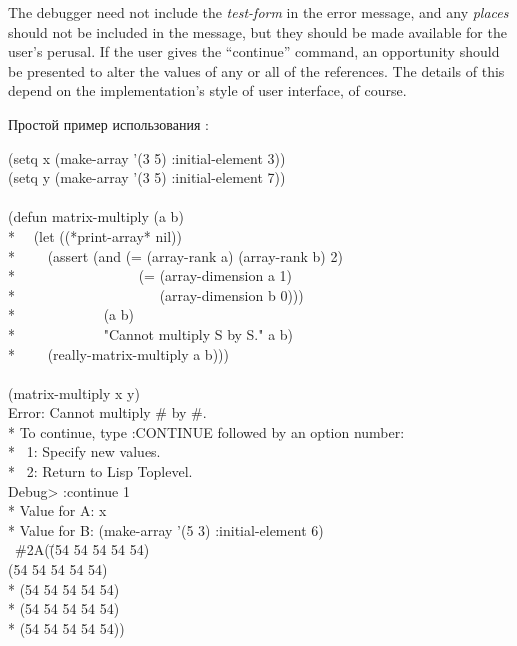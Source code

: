 \begin{defmac}
\beforenoterule
\begin{implementation}
  The debugger need not include the \emph{test-form} in the error message, and
  any \emph{places} should not be included in the message, but they should be
  made available for the user's perusal. If the user gives the ``continue''
  command, an opportunity should be presented to alter the values of any or all
  of the references. The details of this depend on the implementation's style of
  user interface, of course.
\end{implementation}
\afternoterule

Простой пример использования :
\begin{lisp}
(setq x (make-array '(3 5) :initial-element 3)) \\
(setq y (make-array '(3 5) :initial-element 7)) \\
 \\
(defun matrix-multiply (a b) \\*
~~(let ((*print-array* nil)) \\*
~~~~(assert (and (= (array-rank a) (array-rank b) 2) \\*
~~~~~~~~~~~~~~~~~(= (array-dimension a 1) \\*
~~~~~~~~~~~~~~~~~~~~(array-dimension b 0))) \\*
~~~~~~~~~~~~(a b) \\*
~~~~~~~~~~~~"Cannot multiply {\Xtilde}S by {\Xtilde}S." a b) \\*
~~~~(really-matrix-multiply a b))) \\
 \\
(matrix-multiply x y) \\
Error: Cannot multiply \#<ARRAY-3-5 12345> by \#<ARRAY-3-5 12364>. \\*
To continue, type :CONTINUE followed by an option number: \\*
~1: Specify new values. \\*
~2: Return to Lisp Toplevel. \\
Debug> :continue 1 \\*
Value for A: x \\*
Value for B: (make-array '(5 3) :initial-element 6) \\
~\EV \#2A(\=(54 54 54 54 54) \\
\>(54 54 54 54 54) \\*
\>(54 54 54 54 54) \\*
\>(54 54 54 54 54) \\*
\>(54 54 54 54 54))
\end{lisp}
\end{defmac}

